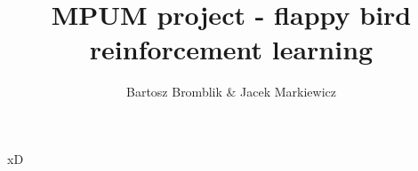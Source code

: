 \documentclass[12pt, A4]{article}
\title{MPUM project - flappy bird reinforcement learning}
\author{Bartosz Bromblik \& Jacek Markiewicz}
\date{}
\begin{document}
\maketitle

xD
\end{document}
